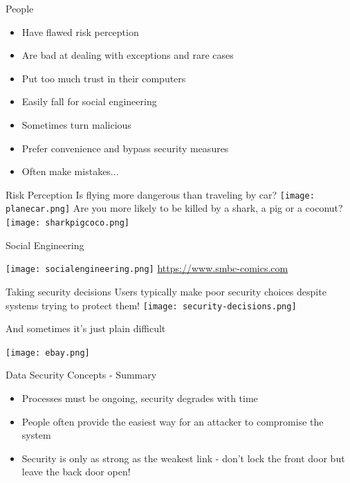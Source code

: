 \documentclass[aspectratio=169]{beamer}
\begin{document}
\begin{frame}{People}
	\begin{itemize}
		\item Have flawed risk perception
		\item Are bad at dealing with exceptions and rare cases
        \item Put too much trust in their computers
        \item Easily fall for social engineering
        \item Sometimes turn malicious
        \item Prefer convenience and bypass security measures
        \item Often make mistakes...
	\end{itemize}
\end{frame}

\begin{frame}{Risk Perception}
Is flying more dangerous than traveling by car?
\newline
\texttt{[image: planecar.png]}
\newline 
Are you more likely to be killed by a shark, a pig or a coconut?
\newline
\texttt{[image: sharkpigcoco.png]}
\end{frame}

\begin{frame}{Social Engineering}
\begin{center}
\texttt{[image: socialengineering.png]}\newline
{\small \url{https://www.smbc-comics.com}}
\end{center}
\end{frame}

\begin{frame}{Taking security decisions}
Users typically make poor security choices despite systems trying to protect them!
\texttt{[image: security-decisions.png]}
\end{frame}

\begin{frame}{And sometimes it's just plain difficult}
\begin{center}
\texttt{[image: ebay.png]}
\end{center}
\end{frame}

\begin{frame}{Data Security Concepts - Summary}
\begin{itemize}
\item Processes must be ongoing, security degrades with time
\item People often provide the easiest way for an attacker to compromise the system 
\item Security is only as strong as the weakest link - don't lock the front door but leave the back door open!
\end{itemize}
\end{frame}
\end{document}
